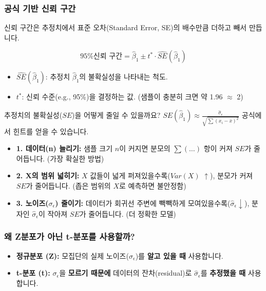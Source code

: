 \documentclass[11pt,a4paper]{book}
\theoremstyle{definition}
\begin{document}
\subsubsection{공식 기반 신뢰 구간}

신뢰 구간은 추정치에서 표준 오차(Standard Error, SE)의 배수만큼 더하고 빼서 만듭니다.

$$ \text{95\% 신뢰 구간} = \hat{\beta}_1 \pm t^* \cdot \hat{SE}(\hat{\beta}_1) $$

\begin{itemize}
    \item $\hat{SE}(\hat{\beta}_1)$: 추정치 $\hat{\beta}_1$의 불확실성을 나타내는 척도.
    \item $t^*$: 신뢰 수준(e.g., 95\%)을 결정하는 값. (샘플이 충분히 크면 약 1.96 $\approx$ 2)
\end{itemize}

\begin{examplebox}[title=표준 오차(SE)를 줄이는 방법 (직관)]
    추정치의 불확실성($SE$)을 어떻게 줄일 수 있을까요? $SE(\hat{\beta}_1) \approx \frac{\hat{\sigma}_{\epsilon}}{\sqrt{\sum(x_i - \bar{x})^2}}$ 공식에서 힌트를 얻을 수 있습니다.

    \begin{itemize}
        \item \textbf{1. 데이터(n) 늘리기:} 샘플 크기 $n$이 커지면 분모의 $\sum(\dots)$ 항이 커져 $SE$가 줄어듭니다. (가장 확실한 방법)
        \item \textbf{2. X의 범위 넓히기:} $X$ 값들이 넓게 퍼져있을수록($Var(X)$ $\uparrow$), 분모가 커져 $SE$가 줄어듭니다. (좁은 범위의 $X$로 예측하면 불안정함)
        \item \textbf{3. 노이즈($\sigma_\epsilon$) 줄이기:} 데이터가 회귀선 주변에 빽빽하게 모여있을수록($\hat{\sigma}_\epsilon \downarrow$), 분자인 $\hat{\sigma}_\epsilon$이 작아져 $SE$가 줄어듭니다. (더 정확한 모델)
    \end{itemize}
\end{examplebox}

\subsubsection{왜 Z분포가 아닌 t-분포를 사용할까?}

\begin{itemize}
    \item \textbf{정규분포 (Z):} 모집단의 실제 노이즈($\sigma_\epsilon$)를 \textbf{알고 있을 때} 사용합니다.
    \item \textbf{t-분포 (t):} $\sigma_\epsilon$을 \textbf{모르기 때문에} 데이터의 잔차(residual)로 $\hat{\sigma}_\epsilon$를 \textbf{추정했을 때} 사용합니다.
\end{itemize}
\end{document}
